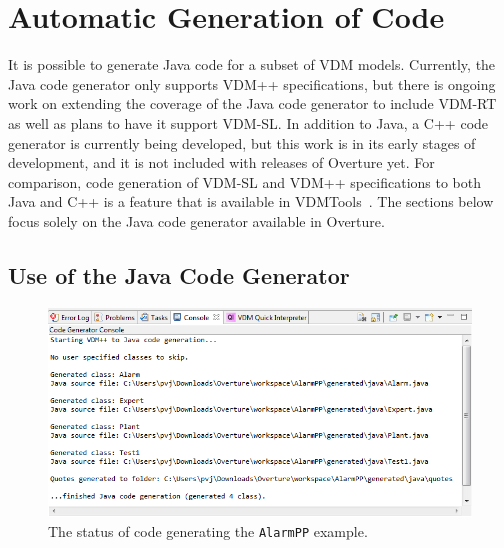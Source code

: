 \documentclass{overturerepchap}
\begin{document}
\chapter{Automatic Generation of Code}\label{sec:codegen}

It is possible to generate Java code for a subset of VDM models. Currently, the Java code generator only supports VDM++ specifications, but there is ongoing work on extending the coverage of the Java code generator to include VDM-RT as well as plans to have it support VDM-SL. In addition to Java, a C++ code generator is currently being developed, but this work is in its early stages of development, and it is not included with releases of Overture yet. For comparison, code generation of VDM-SL and VDM++ specifications to both Java and C++ is a feature that is available in VDMTools~\cite{Java2VDMMan,CGMan,CGManPP}. The sections below focus solely on the Java code generator available in Overture.

\section{Use of the Java Code Generator}
\label{sec:javacg_use}

\begin{figure}[htbp]
\begin{center}
\includegraphics[width=12cm]{screenDumps/javacg_output}
\caption{The status of code generating the \texttt{AlarmPP} example.\label{fig:javacg_output}}
\end{center}
\end{figure}
\end{document}
